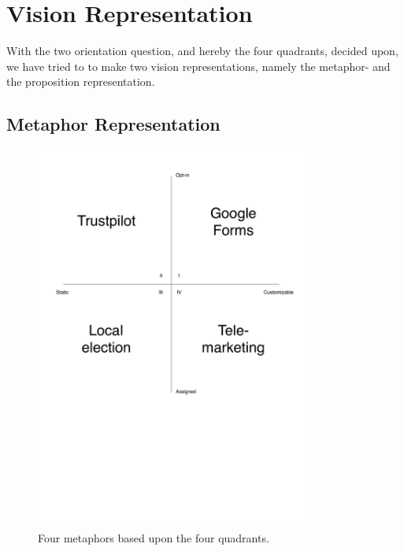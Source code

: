 
\section{Vision Representation}
\label{sec:vision_representation}


With the two orientation question, and hereby the four quadrants, decided upon, we have tried to to make two vision representations, namely the metaphor- and the proposition representation.

\subsection{Metaphor Representation}
\label{sub:metaphor_representation}

\begin{figure}[!htbp]
	\centering
	\includegraphics[width=0.8\textwidth]{graphic/problem_analysis/vision/metaphor.pdf}
	\caption{Four metaphors based upon the four quadrants.}
	\label{fig:metaphor}
\end{figure}
\FloatBarrier

